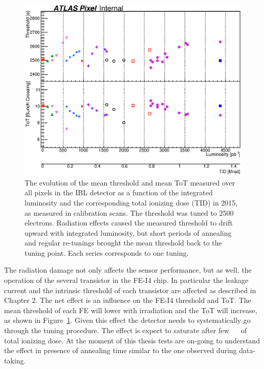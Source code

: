 \begin{figure}
\centering
\includegraphics[width=1.\textwidth]{Images/IBL_commissioning/summary_canvas.eps}
\caption{The evolution of the mean threshold and mean ToT measured over all pixels in the IBL detector as a function of the integrated luminosity and the corresponding total ionizing dose (TID) in 2015, as measured in calibration scans. The threshold was tuned to 2500 electrons. Radiation effects caused the measured threshold to drift upward with integrated luminosity, but short periods of annealing and regular re-tunings brought the mean threshold back to the tuning point. Each series corresponds to one tuning.
}
\label{pic:thr_tot_evolution}
\end{figure}
The radiation damage not only affects the sensor performance, but as well, the operation of the several transistor in the FE-I4 chip. In particular the leakage current and the intrinsic threshold of each transistor are affected as described in Chapter 2. The net effect is an influence on the FE-I4 threshold and ToT. The mean threshold of each FE will lower with irradiation and the ToT will increase, as shown in Figure~\ref{pic:thr_tot_evolution}. Given this effect the detector needs to systematically go through the tuning procedure. The effect is expect to saturate after few \SI{}{\mega\radians} of total ionizing dose. At the moment of this thesis tests are on-going to understand the effect in presence of annealing time similar to the one observed during data-taking.\\




